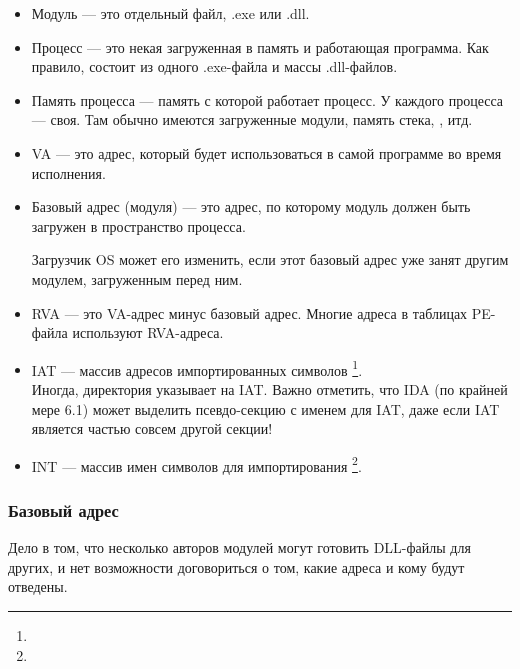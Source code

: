 \begin{itemize}
\item
Модуль --- это отдельный файл, .exe или .dll.

\item Процесс --- это некая загруженная в память и работающая программа.
Как правило, состоит из одного .exe-файла и массы .dll-файлов.

\item Память процесса --- память с которой работает процесс.
У каждого процесса --- своя.
Там обычно имеются загруженные модули, память стека, , итд.

\item
{}
\ac{VA} --- это адрес, который будет использоваться в самой программе во время исполнения.

\item
{}
Базовый адрес (модуля) --- это адрес, по которому модуль должен быть загружен в пространство процесса.

Загрузчик \ac{OS} может его изменить, если этот базовый адрес уже занят другим модулем, загруженным перед ним.

\item
{}
\ac{RVA} --- это \ac{VA}-адрес минус базовый адрес. Многие адреса в таблицах PE-файла используют \ac{RVA}-адреса.


\item 
{}
\ac{IAT} --- массив адресов импортированных символов \footnote{\PietrekPE}. \\
Иногда, директория  указывает на \ac{IAT}. 
\label{IDA_idata} Важно отметить, что \ac{IDA} (по крайней мере 6.1) может выделить псевдо-секцию с именем  для \ac{IAT}, даже если \ac{IAT} является частью совсем другой секции!

\item 
{}
\ac{INT} --- массив имен символов для импортирования \footnote{\PietrekPE}.
\end{itemize}

\subsubsection{Базовый адрес}

Дело в том, что несколько авторов модулей могут готовить DLL-файлы для других, и нет возможности договориться о том, какие адреса и кому будут отведены.


